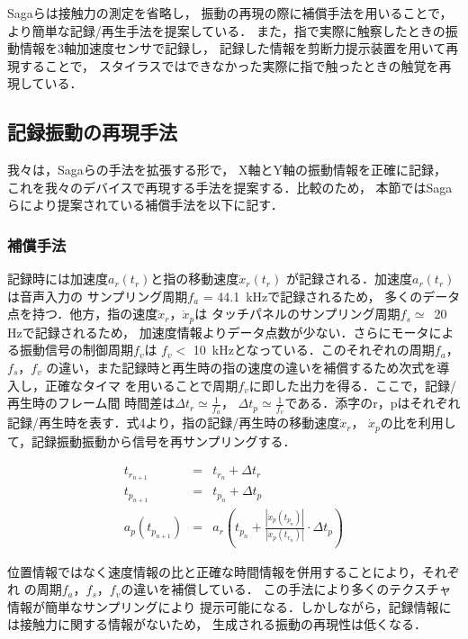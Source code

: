 Sagaら\cite{saga2013simultaneous}は接触力の測定を省略し，
振動の再現の際に補償手法を用いることで，
より簡単な記録/再生手法を提案している．
また，指で実際に触察したときの振動情報を3軸加速度センサで記録し，
記録した情報を剪断力提示装置を用いて再現することで，
スタイラスではできなかった実際に指で触ったときの触覚を再現している．

\subsection{記録振動の再現手法　\label{2-4-2}}
我々は，Sagaら\cite{saga2013simultaneous}の手法を拡張する形で，
X軸とY軸の振動情報を正確に記録，
これを我々のデバイスで再現する手法を提案する．比較のため，
本節ではSagaらにより提案されている補償手法を以下に記す．

\subsubsection*{補償手法}

記録時には加速度$a_{r}(t_{r})$と指の移動速度$\dot{x}_{r}(t_{r})$
が記録される．加速度$a_{r}(t_{r})$は音声入力の
サンプリング周期$f_{a}$ = 44.1\ kHzで記録されるため，
多くのデータ点を持つ．他方，指の速度$\dot{x}_{r}$，$\dot{x}_{p}$は
タッチパネルのサンプリング周期$f_{s} \simeq$\ 20 Hzで記録されるため，
加速度情報よりデータ点数が少ない．さらにモータによる振動信号の制御周期$f_{v}$は
$f_{v} <$ 10\ kHzとなっている．このそれぞれの周期$f_{a}$，$f_{s}$，$f_{v}$
の違い，また記録時と再生時の指の速度の違いを補償するため次式を導入し，正確なタイマ
を用いることで周期$f_{v}$に即した出力を得る．ここで，記録/再生時のフレーム間
時間差は$\Delta t_{r} \simeq \frac{1}{f_{a}}$，
$\Delta t_{p} \simeq \frac{1}{f_{v}}$である．添字のr，pはそれぞれ
記録/再生時を表す．式4より，指の記録/再生時の移動速度$\dot{x}_{r}$，
$\dot{x}_{p}$の比を利用して，記録振動振動から信号を再サンプリングする．\par
\begin{eqnarray}
t_{r_{n+1}} &=& t_{r_n} + \Delta t_r \\
t_{p_{n+1}} &=& t_{p_{n}} + \Delta t_{p} \\
a_p(t_{p_{n+1}}) &=& a_r(t_{p_{n}} + \frac{|\dot{x}_p(t_{p_{n}})|}
{|\dot{x}_p(t_{r_{n}})|} \cdot \Delta t_{p} )
\end{eqnarray}

位置情報ではなく速度情報の比と正確な時間情報を併用することにより，それぞれ
の周期$f_{a}$，$f_{s}$，$f_{v}$の違いを補償している．
この手法により多くのテクスチャ情報が簡単なサンプリングにより
提示可能になる．しかしながら，記録情報には接触力に関する情報がないため，
生成される振動の再現性は低くなる．\par

